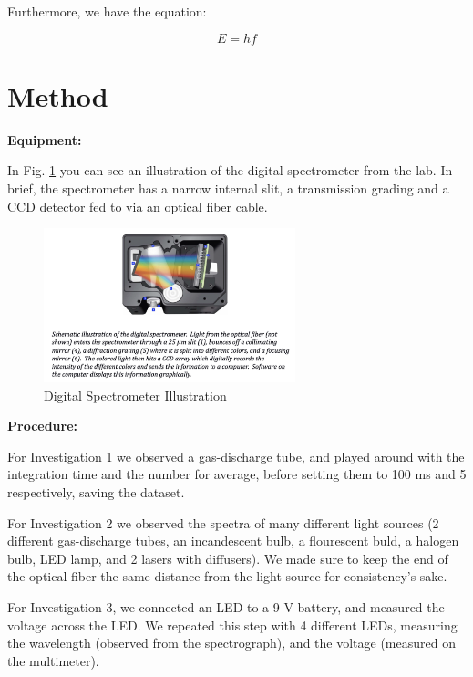 \documentclass{article}[12pt]
\renewcommand{\figurename}{Fig. }
\begin{document}
Furthermore, we have the equation:

\begin{equation}
  E=hf
  \label{ehf}
\end{equation}

\section{Method}

\noindent \textbf{Equipment:}

In \figurename \ref{spectrometer} you can see an illustration of the digital spectrometer from the lab.
In brief, the spectrometer has a narrow internal slit, a transmission grading and a CCD detector fed to via an optical fiber cable.

\begin{figure}
  \centering
  \includegraphics[width=0.65\textwidth]{figures/spectrometer.png}
  \caption{Digital Spectrometer Illustration}
  \label{spectrometer}
\end{figure}

\noindent \textbf{Procedure:}

For Investigation 1 we observed a gas-discharge tube, and played around with the integration time and the number for average, before setting them to 100 ms and 5 respectively, saving the dataset.

For Investigation 2 we observed the spectra of many different light sources (2 different gas-discharge tubes, an incandescent bulb, a flourescent buld, a halogen bulb, LED lamp, and 2 lasers with diffusers). We made sure to keep the end of the optical fiber the same distance from the light source for consistency's sake.

For Investigation 3, we connected an LED to a 9-V battery, and measured the voltage across the LED.
We repeated this step with 4 different LEDs, measuring the wavelength (observed from the spectrograph), and the voltage (measured on the multimeter).
\end{document}
